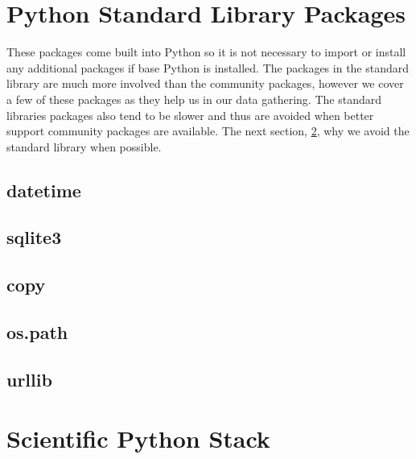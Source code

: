 \documentclass[11pt,a4paper]{book}
\begin{document}
	\section{Python Standard Library Packages}
		\label{sec:Python Standard Library Packages}
		These packages come built into Python so it is not necessary to import or install any additional packages if base Python is installed. The packages in the standard library are much more involved than the community packages, however we cover a few of these packages as they help us in our data gathering. The standard libraries packages also tend to be slower and thus are avoided when better support community packages are available. The next section, \ref{sec:Scientific Python Stack}, why we avoid the standard library when possible.
		\subsection{datetime}
			\label{subsec:datetime}
		\subsection{sqlite3}
			\label{subsec:sqlite3}
		\subsection{copy}
			\label{subsec:copy}
		\subsection{os.path}
			\label{subsec:os.path}
		\subsection{urllib}
			\label{subsec:urllib}
		
			
	\section{Scientific Python Stack}
		\label{sec:Scientific Python Stack}
\end{document}
